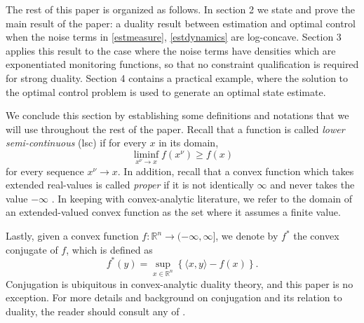 \documentclass[12pt]{article}
\newcommand{\R}{{\mathbb R}}
\theoremstyle{remark}
\theoremstyle{remark}
\begin{document}



The rest of this paper is organized as follows. In section 2 we state
and prove the main result of the paper: a duality result between
estimation and optimal control when the noise terms in \eqref{estmeasure},
\eqref{estdynamics} are
log-concave. Section 3 applies this result to the case where the
noise terms have densities which are exponentiated monitoring
functions, so that no constraint qualification is required for strong
duality. Section 4 contains a practical example, where the solution to
the optimal control problem is used to generate an optimal state estimate.



We conclude this section by establishing some definitions and notations that we will use
throughout the rest of the paper. Recall that a function is called
\emph{lower semi-continuous} (lsc) if for every $x$ in its domain,
$$\liminf_{x^{\nu} \to x} f(x^{\nu}) \geq f(x)$$
for every sequence $x^{\nu} \to x$. In addition, recall that a convex function
which takes extended real-values is called \emph{proper} if it is not
identically $\infty$ and never takes the value $- \infty$
\cite{VarAnal}.  In keeping with convex-analytic literature, we refer
to the domain of an extended-valued convex function as the set where
it assumes a finite value.

Lastly, given a convex function $f: \R^n \to (-\infty, \infty]$,
 we denote by $f^{*}$ the convex conjugate of $f$, which is defined as
$$f^{*}(y) = \sup_{x \in \R^n} \left\{ \langle x, y \rangle - f(x)
\right\}.$$
Conjugation is ubiquitous in convex-analytic duality theory, and this
paper is no exception. For more details and background on conjugation
and its relation to duality, the reader
should consult any of \cite{ConjDual} \cite{ConvAnal} \cite{VarAnal}.
\end{document}
